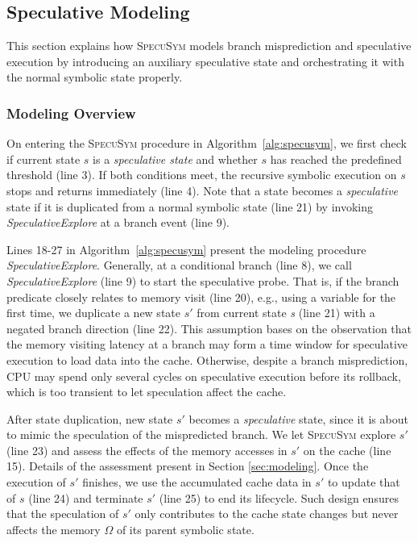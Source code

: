 \documentclass[sigconf,screen]{acmart}
\newcommand{\SpecuSym}{\textsc{SpecuSym} }
\begin{document}
\subsection{Speculative Modeling}
\label{sec:spec_modeling}

This section explains how \SpecuSym models branch misprediction and
speculative execution by introducing an auxiliary speculative state and 
orchestrating it with the normal symbolic state properly.

\subsubsection{Modeling Overview}
On entering the \SpecuSym procedure in Algorithm~\ref{alg:specusym}, we
first check if current state $s$ is a \textit{speculative state} and 
whether $s$ has reached the predefined threshold (line 3). If both 
conditions meet, the recursive symbolic execution on $s$ stops and returns 
immediately (line 4). Note that a state becomes a \textit{speculative} 
state if it is duplicated from a normal symbolic state (line 21) by invoking 
\textit{SpeculativeExplore} at a branch event (line 9). 


Lines 18-27 in Algorithm~\ref{alg:specusym} present the modeling procedure 
\textit{SpeculativeExplore}. Generally, at a conditional branch (line 8), 
we call \textit{SpeculativeExplore} (line 9) to start the speculative probe. 
That is, if the branch predicate closely relates to memory visit (line 20), 
e.g., using a variable for the first time, we duplicate a new state $s'$ 
from current state \textit{s} (line 21) with a negated branch direction 
(line 22). This assumption bases on the observation that the memory visiting 
latency at a branch may form a time window for speculative execution to load 
data into the cache. Otherwise, despite a branch misprediction, CPU may spend 
only several cycles on speculative execution before its rollback, which is too 
transient to let speculation affect the cache.


After state duplication, new state ${s'}$ becomes a \textit{speculative} state, 
since it is about to mimic the speculation of the mispredicted branch. We let 
\SpecuSym explore $s'$ (line 23) and assess the effects of the memory accesses 
in $s'$ on the cache (line 15). Details of the assessment present in Section
\ref{sec:modeling}. Once the execution of $s'$ finishes, we use the accumulated 
cache data in $s'$ to update that of $s$ (line 24) and terminate $s'$ (line 25) 
to end its lifecycle. Such design ensures that the speculation of $s'$ only 
contributes to the cache state changes but never affects the memory $\Omega$ of 
its parent symbolic state.
\end{document}
